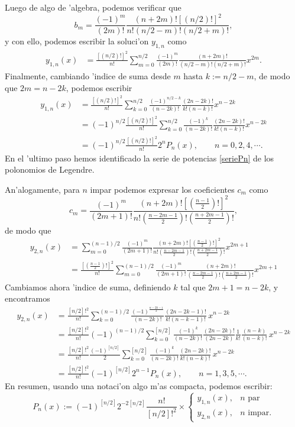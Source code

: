 Luego de algo de 'algebra, podemos verificar que
\begin{equation}
b_m=\frac{(-1)^m}{(2m)!}\frac{(n+2m)![(n/2)!]^2}{n!(n/2-m)!(n/2+m)!},
\end{equation}
y con ello, podemos escribir la soluci'on $y_{1,n}$ como
\begin{align}
y_{1,n}(x) &= \frac{[(n/2)!]^2}{n!}\sum_{m=0}^{n/2}\frac{(-1)^m}{(2m)!}\frac{(n+2m)!}{(n/2-m)!(n/2+m)!}x^{2m}.
\end{align}
Finalmente, cambiando 'indice de suma desde $m$ hasta $k:=n/2-m$, de modo que $2m=n-2k$, podemos escribir
\begin{align}
y_{1,n}(x) &= \frac{[(n/2)!]^2}{n!}\sum_{k=0}^{n/2}\frac{(-1)^{n/2-k}}{(n-2k)!}\frac{(2n-2k)!}{k!(n-k)!}x^{n-2k} \\
&= (-1)^{n/2}\frac{[(n/2)!]^2}{n!}\sum_{k=0}^{n/2}\frac{(-1)^{k}}{(n-2k)!}\frac{(2n-2k)!}{k!(n-k)!}x^{n-2k} \\
&= (-1)^{n/2}\frac{[(n/2)!]^2}{n!} 2^n P_n(x), \qquad n=0,2,4,\cdots. \label{y1Pn}
\end{align}
En el 'ultimo paso hemos identificado la serie de potencias \eqref{seriePn} de los polonomios de Legendre.

An'alogamente, para $n$ impar podemos expresar los coeficientes $c_m$ como
\begin{equation}
c_m=\frac{(-1)^m}{(2m+1)!}\frac{(n+2m)![\left(\frac{n-1}{2}\right)!]^2}{n!\left(\frac{n-2m-1}{2}\right)!\left(\frac{n+2m-1}{2}\right)!},
\end{equation}
de modo que
\begin{align}
y_{2,n}(x) &= \sum_{m=0}^{(n-1)/2}\frac{(-1)^m}{(2m+1)!}\frac{(n+2m)![\left(\frac{n-1}{2}\right)!]^2}{n!\left(\frac{n-2m-1}{2}\right)!\left(\frac{n+2m-1}{2}\right)!}x^{2m+1} \\
&= \frac{[\left(\frac{n-1}{2}\right)!]^2}{n!}\sum_{m=0}^{(n-1)/2}\frac{(-1)^m}{(2m+1)!}\frac{(n+2m)!}{\left(\frac{n-2m-1}{2}\right)!\left(\frac{n+2m-1}{2}\right)!}x^{2m+1}
\end{align}
Cambiamos ahora 'indice de suma, definiendo $k$ tal que $2m+1=n-2k$, y encontramos
\begin{align}
y_{2,n}(x) &= \frac{[n/2]!^2}{n!}\sum_{k=0}^{(n-1)/2}\frac{(-1)^{\frac{n-2k-1}{2}}}{(n-2k)!}\frac{(2n-2k-1)!}{k!(n-k-1)!}\,x^{n-2k} \\
&= \frac{[n/2]!^2}{n!}(-1)^{(n-1)/2}\sum_{k=0}^{[n/2]}\frac{(-1)^k}{(n-2k)!}\frac{(2n-2k)!}{(2n-2k)}\frac{1}{k!}\frac{(n-k)}{(n-k)!}\,x^{n-2k} \\
&= \frac{[n/2]!^2}{n!}\frac{(-1)^{[n/2]}}{2}\sum_{k=0}^{[n/2]}\frac{(-1)^k}{(n-2k)!}\frac{(2n-2k)!}{k!(n-k)!}\,x^{n-2k} \\
&= \frac{[n/2]!^2}{n!}(-1)^{[n/2]}2^{n-1} P_n(x), \qquad n=1,3,5,\cdots. \label{y2Pn}
\end{align}
En resumen, usando una notaci'on algo m'as compacta, podemos escribir:
\begin{equation}
P_n(x):=(-1)^{[n/2]}2^{-2[n/2]}\frac{n!}{[n/2]!^2} \times
	\begin{cases}
	y_{1,n}(x) , & n \text{ par}\\
	y_{2,n}(x), & n \text{ impar}.
	\end{cases}
\end{equation}

